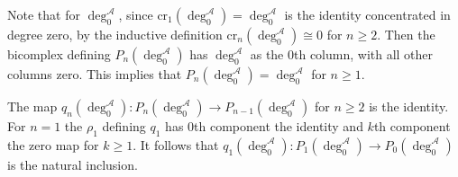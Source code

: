 \begin{eg}{}
    Note that for $\deg_0^\mathcal{A}$, since $\text{cr}_1(\deg_0^\mathcal{A}) = \deg_0^\mathcal{A}$ is the identity concentrated in degree zero, by the inductive definition $\text{cr}_n(\deg_0^\mathcal{A})\cong 0$ for $n \geq 2$. Then the bicomplex defining $P_n(\deg_0^\mathcal{A})$ has $\deg_0^\mathcal{A}$ as the $0$th column, with all other columns zero. This implies that $P_n(\deg_0^\mathcal{A}) = \deg_0^\mathcal{A}$ for $n \geq 1$.

    The map $q_n(\deg_0^\mathcal{A}):P_n(\deg_0^\mathcal{A})\rightarrow P_{n-1}(\deg_0^\mathcal{A})$ for $n \geq 2$ is the identity. For $n = 1$ the $\rho_1$ defining $q_1$ has $0$th component the identity and $k$th component the zero map for $k \geq 1$. It follows that $q_1(\deg_0^\mathcal{A}):P_1(\deg_0^\mathcal{A})\rightarrow P_0(\deg_0^\mathcal{A})$ is the natural inclusion.
\end{eg}
